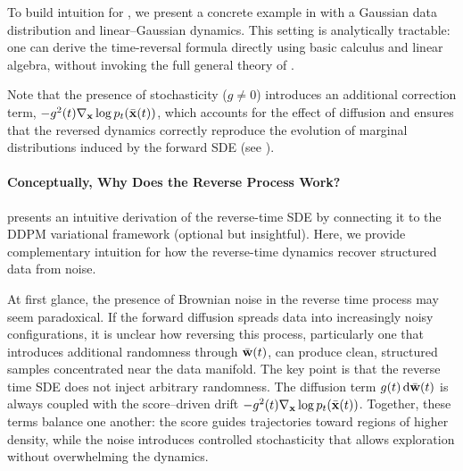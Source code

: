 
To build intuition for , we present a concrete example in  with a Gaussian data distribution and linear–Gaussian dynamics. This setting is analytically tractable: one can derive the time-reversal formula directly using basic calculus and linear algebra, without invoking the full general theory of \citet{anderson1982reverse}.

Note that the presence of stochasticity ($g\neq 0$) introduces an additional correction term, $ -g^2(t) \nabla_{{\mathbf{x}}} \log p_t(\bar{{\mathbf{x}}}(t))$, which accounts for the effect of diffusion and ensures that the reversed dynamics correctly reproduce the evolution of marginal distributions induced by the forward SDE (see ).

\paragraph{Conceptually, Why Does the Reverse Process Work?}  presents an intuitive derivation of the reverse-time SDE by connecting it to the DDPM variational framework (optional but insightful). Here, we provide complementary intuition for how the reverse-time dynamics recover structured data from noise. 


At first glance, the presence of Brownian noise in the reverse time process may seem paradoxical. If the forward diffusion spreads data into increasingly noisy configurations, it is unclear how reversing this process, particularly one that introduces additional randomness through $\bar{{\mathbf{w}}}(t)$, can produce clean, structured samples concentrated near the data manifold. The key point is that the reverse time SDE does not inject arbitrary randomness. The diffusion term $g(t)\mathop{}\!\mathrm{d}\bar{{\mathbf{w}}}(t)$ is always coupled with the score–driven drift $- g^2(t)\nabla_{{\mathbf{x}}}\log p_t(\bar{{\mathbf{x}}}(t))$. Together, these terms balance one another: the score guides trajectories toward regions of higher density, while the noise introduces controlled stochasticity that allows exploration without overwhelming the dynamics.

